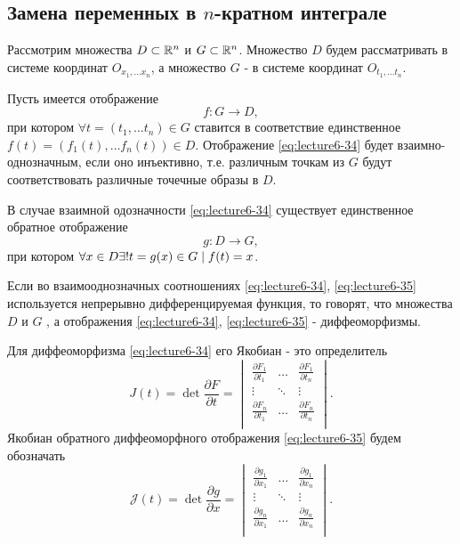 \subsection{Замена переменных в $n$-кратном интеграле}
Рассмотрим множества $D \subset \mathbb{R}^{n}$ и $G \subset \mathbb{R}^{n}$. Множество $D$ будем рассматривать в системе координат $O_{x_1,\ldots x_n}$,
а множество $G$ - в системе координат $O_{t_1,\ldots t_n}$.

Пусть имеется отображение
\begin{equation}
	\label{eq:lecture6-34}
	f : G \to D,
\end{equation}
при котором $\forall t = (t_1, \ldots t_n) \in G$ ставится в соответствие
единственное ${f(t) = (f_1(t), \ldots f_n(t)) \in D}$. Отображение \eqref{eq:lecture6-34}
будет взаимно-однозначным, если оно инъективно, т.е. различным точкам из $G$
будут соответствовать различные точечные образы в $D$.

В случае взаимной одозначности \eqref{eq:lecture6-34} существует единственное
обратное отображение
\begin{equation}
	\label{eq:lecture6-35}
	g : D \to G,
\end{equation}
при котором $\forall x \in D \exists ! t = g(x) \in G \suchthat f(t) = x$.

Если во взаимооднозначных соотношениях \eqref{eq:lecture6-34}, \eqref{eq:lecture6-35}
используется непрерывно дифференцируемая функция, то говорят, что множества $D$
и $G$ , а отображения \eqref{eq:lecture6-34},
\eqref{eq:lecture6-35} - диффеоморфизмы.

Для диффеоморфизма \eqref{eq:lecture6-34} его Якобиан - это определитель
\begin{equation}
	\label{eq:lecture6-36}
	J(t) = \det\dfrac{\partial F}{\partial t} =
	\begin{vmatrix}
		\frac{\partial F_1}{\partial t_1} & \ldots & \frac{\partial F_1}{\partial t_n}\\
		\vdots & \ddots & \vdots\\
		\frac{\partial F_n}{\partial t_1} & \ldots & \frac{\partial F_n}{\partial t_n}\\
	\end{vmatrix}.
\end{equation}
Якобиан обратного диффеоморфного отображения \eqref{eq:lecture6-35} будем обозначать
\begin{equation}
	\label{eq:lecture6-37}
	\mathcal{J}(t) = \det\dfrac{\partial g}{\partial x} =
	\begin{vmatrix}
		\frac{\partial g_1}{\partial x_1} & \ldots & \frac{\partial g_1}{\partial x_n}\\
		\vdots & \ddots & \vdots\\
		\frac{\partial g_n}{\partial x_1} & \ldots & \frac{\partial g_n}{\partial x_n}\\
	\end{vmatrix}.
\end{equation}

